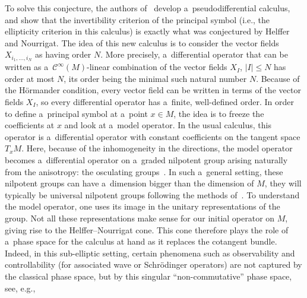 \documentclass[10pt,a4paper]{article}
\newcommand{\CCC}{\mathscr{C}} %
\numberwithin{equation}{section}
\theoremstyle{definition}
\begin{document}
To solve this conjecture, the authors of~\cite{AMYMaximalHypoellipticity} develop a~pseudodifferential calculus, and show that the invertibility criterion of the principal symbol (i.e., the ellipticity criterion in this calculus) is exactly what was conjectured by Helffer and Nourrigat. The idea of this new calculus is to consider the vector fields $X_{i_1,\dots,i_N}$ as having order $N$. More precisely, a~differential operator that can be written as a~$\CCC^{\infty}(M)$-linear combination of the vector fields $X_{I}$, $|I|\leq N$ has order at most $N$, its order being the minimal such natural number $N$. Because of the H\"ormander condition, every vector field can be written in terms of the vector fields $X_I$, so every differential operator has a~finite, well-defined order. In order to define a~principal symbol at a~point $x\in M$, the idea is to freeze the coefficients at $x$ and look at a~model operator. In the usual calculus, this operator is a~differential operator with constant coefficients on the tangent space $T_xM$. Here, because of the inhomogeneity in the directions, the model operator becomes a~differential operator on a~graded nilpotent group arising naturally from the anisotropy: the osculating groups~\cite{AMYMaximalHypoellipticity,RothschildStein}. In such a~general setting, these nilpotent groups can have a~dimension bigger than the dimension of $M$, they will typically be universal nilpotent groups following the methods of~\cite{RothschildStein}. To understand the model operator, one uses its image in the unitary representations of the group. Not all these representations make sense for our initial operator on $M$, giving rise to the Helffer--Nourrigat cone. This cone therefore plays the role of a~phase space for the calculus at hand as it replaces the cotangent bundle. Indeed, in this sub-elliptic setting, certain phenomena such as observability and controllability (for associated wave or Schr\"odinger operators) are not captured by the classical phase space, but by this singular ``non-commutative'' phase space, see, e.g., \cite{FermanianLetrouit,Letrouit}
\end{document}
